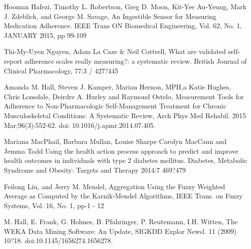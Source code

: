 \documentclass{llncs}
\begin{document}
\begin{thebibliography}{99}
 Hooman Hafezi, Timothy L. Robertson, Greg D. Moon, Kit-Yee Au-Yeung, Mark J. Zdeblick, and George M. Savage, An Ingestible Sensor for Measuring Medication Adherence. IEEE Trans ON Biomedical Engineering, Vol. 62, No. 1, JANUARY 2015, pp 99-109

 Thi-My-Uyen Nguyen, Adam La Caze \& Neil Cottrell, What are validated
self-report adherence scales really measuring?: a systematic review. British Journal of Clinical Pharmacology, 77:3 / 427?445

 Amanda M. Hall, Steven J. Kamper, Marian Hernon, MPH,a Katie Hughes,  Chris Lonsdale, Deirdre A. Hurley and Raymond Ostelo, Measurement Tools for Adherence to Non-Pharmacologic Self-Management Treatment for Chronic Musculoskeletal Conditions: A Systematic Review, Arch Phys Med Rehabil. 2015 Mar;96(3):552-62. doi: 10.1016/j.apmr.2014.07.405.

 Mariana MacPhail, Barbara Mullan, Louise Sharpe Carolyn MacCann and Jemma Todd Using the health action process approach to predict and improve health outcomes in individuals with type 2 diabetes mellitus. Diabetes, Metabolic Syndrome and Obesity: Targets and Therapy 2014:7 469?479

 Feilong Liu,  and Jerry M. Mendel, Aggregation Using the Fuzzy Weighted Average as
Computed by the Karnik-Mendel Algorithms, IEEE Trans. on Fuzzy Systems, Vol. 16, No. 1, pp-1 - 12 

 M. Hall, E. Frank, G. Holmes, B. Pfahringer, P. Reutemann, I.H. Witten, The WEKA Data Mining Software:
An Update, SIGKDD Explor Newsl. 11 (2009) 10?18. doi:10.1145/1656274.1656278.

\end{thebibliography}
\end{document}
